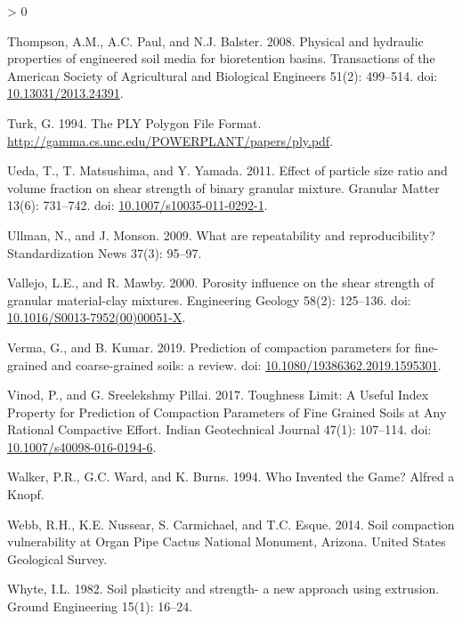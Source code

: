 \documentclass[
  letterpaper,
  openany]{book}
\newlength{\cslhangindent}
\newenvironment{CSLReferences}[2] %
 {%
  \setlength{\parindent}{0pt}
  \ifodd #1 \everypar{\setlength{\hangindent}{\cslhangindent}}\ignorespaces\fi
  \ifnum #2 > 0
  \setlength{\parskip}{#2\baselineskip}
  \fi
 }%
 {}
\begin{document}
\begin{CSLReferences}{1}{0}
\leavevmode\hypertarget{ref-Thompson2008a}{}%
Thompson, A.M., A.C. Paul, and N.J. Balster. 2008. {Physical and hydraulic properties of engineered soil media for bioretention basins}. Transactions of the American Society of Agricultural and Biological Engineers 51(2): 499--514. doi: \href{https://doi.org/10.13031/2013.24391}{10.13031/2013.24391}.

\leavevmode\hypertarget{ref-Turk1994}{}%
Turk, G. 1994. {The PLY Polygon File Format}. \url{http://gamma.cs.unc.edu/POWERPLANT/papers/ply.pdf}.

\leavevmode\hypertarget{ref-Ueda2011}{}%
Ueda, T., T. Matsushima, and Y. Yamada. 2011. {Effect of particle size ratio and volume fraction on shear strength of binary granular mixture}. Granular Matter 13(6): 731--742. doi: \href{https://doi.org/10.1007/s10035-011-0292-1}{10.1007/s10035-011-0292-1}.

\leavevmode\hypertarget{ref-Ullman2009}{}%
Ullman, N., and J. Monson. 2009. {What are repeatability and reproducibility?} Standardization News 37(3): 95--97.

\leavevmode\hypertarget{ref-Vallejo2000}{}%
Vallejo, L.E., and R. Mawby. 2000. {Porosity influence on the shear strength of granular material-clay mixtures}. Engineering Geology 58(2): 125--136. doi: \href{https://doi.org/10.1016/S0013-7952(00)00051-X}{10.1016/S0013-7952(00)00051-X}.

\leavevmode\hypertarget{ref-Verma2019}{}%
Verma, G., and B. Kumar. 2019. {Prediction of compaction parameters for fine-grained and coarse-grained soils: a review}. doi: \href{https://doi.org/10.1080/19386362.2019.1595301}{10.1080/19386362.2019.1595301}.

\leavevmode\hypertarget{ref-Vinod2017}{}%
Vinod, P., and G. Sreelekshmy Pillai. 2017. {Toughness Limit: A Useful Index Property for Prediction of Compaction Parameters of Fine Grained Soils at Any Rational Compactive Effort}. Indian Geotechnical Journal 47(1): 107--114. doi: \href{https://doi.org/10.1007/s40098-016-0194-6}{10.1007/s40098-016-0194-6}.

\leavevmode\hypertarget{ref-Walker1994}{}%
Walker, P.R., G.C. Ward, and K. Burns. 1994. {Who Invented the Game?} Alfred a Knopf.

\leavevmode\hypertarget{ref-Webb2014}{}%
Webb, R.H., K.E. Nussear, S. Carmichael, and T.C. Esque. 2014. {Soil compaction vulnerability at Organ Pipe Cactus National Monument, Arizona}. United States Geological Survey.

\leavevmode\hypertarget{ref-Whyte1982}{}%
Whyte, I.L. 1982. {Soil plasticity and strength- a new approach using extrusion}. Ground Engineering 15(1): 16--24.


\end{CSLReferences}
\end{document}
